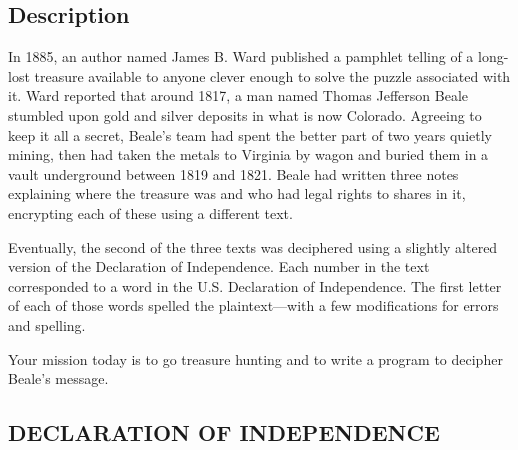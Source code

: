 \subsection{Description}\label{description-17}

In 1885, an author named James B. Ward published a pamphlet telling of a
long-lost treasure available to anyone clever enough to solve the puzzle
associated with it. Ward reported that around 1817, a man named Thomas
Jefferson Beale stumbled upon gold and silver deposits in what is now
Colorado. Agreeing to keep it all a secret, Beale's team had spent the
better part of two years quietly mining, then had taken the metals to
Virginia by wagon and buried them in a vault underground between 1819
and 1821. Beale had written three notes explaining where the treasure
was and who had legal rights to shares in it, encrypting each of these
using a different text.

Eventually, the second of the three texts was deciphered using a
slightly altered version of the Declaration of Independence. Each number
in the text corresponded to a word in the U.S. Declaration of
Independence. The first letter of each of those words spelled the
plaintext---with a few modifications for errors and spelling.

Your mission today is to go treasure hunting and to write a program to
decipher Beale's message.

\subsection{DECLARATION OF
INDEPENDENCE}\label{declaration-of-independence}


